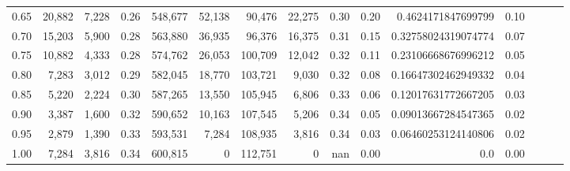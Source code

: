 \begin{tabular}{rrrrrrrrrrrrrrr}
0.65 &  20,882 &  7,228 &  0.26 &  548,677 &   52,138 &   90,476 &   22,275 &  0.30 &  0.20 &   0.4624171847699799 &      0.10 \\
0.70 &  15,203 &  5,900 &  0.28 &  563,880 &   36,935 &   96,376 &   16,375 &  0.31 &  0.15 &  0.32758024319074774 &      0.07 \\
0.75 &  10,882 &  4,333 &  0.28 &  574,762 &   26,053 &  100,709 &   12,042 &  0.32 &  0.11 &  0.23106668676996212 &      0.05 \\
0.80 &   7,283 &  3,012 &  0.29 &  582,045 &   18,770 &  103,721 &    9,030 &  0.32 &  0.08 &  0.16647302462949332 &      0.04 \\
0.85 &   5,220 &  2,224 &  0.30 &  587,265 &   13,550 &  105,945 &    6,806 &  0.33 &  0.06 &  0.12017631772667205 &      0.03 \\
0.90 &   3,387 &  1,600 &  0.32 &  590,652 &   10,163 &  107,545 &    5,206 &  0.34 &  0.05 &  0.09013667284547365 &      0.02 \\
0.95 &   2,879 &  1,390 &  0.33 &  593,531 &    7,284 &  108,935 &    3,816 &  0.34 &  0.03 &  0.06460253124140806 &      0.02 \\
1.00 &   7,284 &  3,816 &  0.34 &  600,815 &        0 &  112,751 &        0 &   nan &  0.00 &                  0.0 &      0.00 \\
\bottomrule
\end{tabular}
